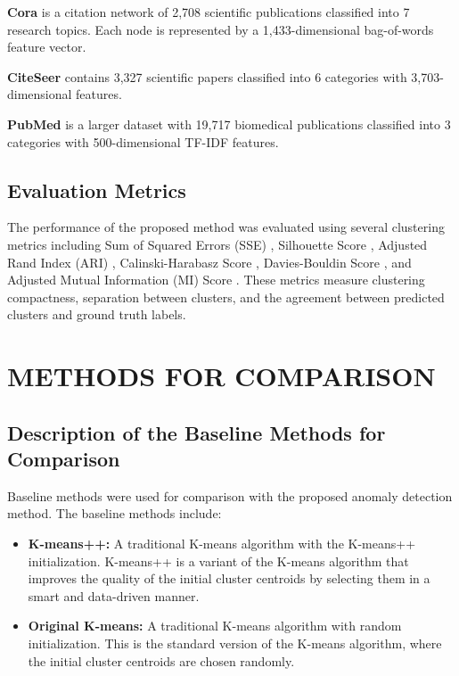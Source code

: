 \documentclass[10pt,twocolumn,a4paper]{article}
\begin{document}
\textbf{Cora} is a citation network of 2,708 scientific publications classified into 7 research topics. Each node is represented by a 1,433-dimensional bag-of-words feature vector.

\textbf{CiteSeer} contains 3,327 scientific papers classified into 6 categories with 3,703-dimensional features.

\textbf{PubMed} is a larger dataset with 19,717 biomedical publications classified into 3 categories with 500-dimensional TF-IDF features.

\subsection{Evaluation Metrics}

The performance of the proposed method was evaluated using several clustering metrics including Sum of Squared Errors (SSE) \cite{james2013introduction}, Silhouette Score \cite{rousseeuw1987silhouettes}, Adjusted Rand Index (ARI) \cite{hubert1985comparing}, Calinski-Harabasz Score \cite{calinski1974dendrite}, Davies-Bouldin Score \cite{davies1979cluster}, and Adjusted Mutual Information (MI) Score \cite{vinh2010information}. These metrics measure clustering compactness, separation between clusters, and the agreement between predicted clusters and ground truth labels.










\section{METHODS FOR COMPARISON}

\subsection{Description of the Baseline Methods for Comparison}

Baseline methods were used for comparison with the proposed anomaly detection method. The baseline methods include:

\begin{itemize}
    \item \textbf{K-means++:} A traditional K-means algorithm with the K-means++ initialization. K-means++ is a variant of the K-means algorithm that improves the quality of the initial cluster centroids by selecting them in a smart and data-driven manner.
    
    \item \textbf{Original K-means:} A traditional K-means algorithm with random initialization. This is the standard version of the K-means algorithm, where the initial cluster centroids are chosen randomly.
\end{itemize}
\end{document}
